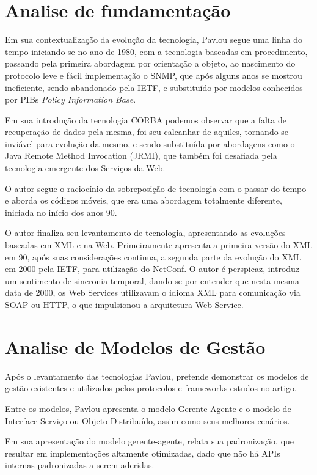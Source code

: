 \documentclass[12pt]{article}
\begin{document}
\section{Analise de fundamentação}

Em sua contextualização da evolução da tecnologia, Pavlou segue uma linha do tempo iniciando-se no ano de 1980, com a tecnologia baseadas em procedimento, passando pela primeira abordagem por orientação a objeto, ao nascimento do protocolo leve e fácil implementação o SNMP, que após alguns anos se mostrou ineficiente, sendo abandonado pela IETF, e substituído por modelos conhecidos por PIBs \textit{Policy Information Base}.

Em sua introdução da tecnologia CORBA podemos observar que a falta de recuperação de dados pela mesma, foi seu calcanhar de aquiles, tornando-se inviável para evolução da mesmo, e sendo substituída por abordagens como o Java Remote Method Invocation (JRMI), que também foi desafiada pela tecnologia emergente dos Serviços da Web.

O autor segue o raciocínio da sobreposição de tecnologia com o passar do tempo e aborda os códigos móveis, que era uma abordagem totalmente diferente, iniciada no início dos anos 90.

O autor finaliza seu levantamento de tecnologia, apresentando as evoluções baseadas em XML e na Web. Primeiramente apresenta a primeira versão do XML em 90, após suas considerações continua, a segunda parte da evolução do XML em 2000 pela IETF, para utilização do NetConf. O autor é perspicaz, introduz um sentimento de sincronia temporal, dando-se por entender que nesta mesma data de 2000, os Web Services utilizavam o idioma XML para comunicação via SOAP ou HTTP, o que impulsionou a arquitetura Web Service.      


\section{Analise de Modelos de Gestão}
	Após o levantamento das tecnologias Pavlou, pretende demonstrar os modelos de gestão existentes e utilizados pelos protocolos e frameworks estudos no artigo.
	
	Entre os modelos, Pavlou apresenta o modelo Gerente-Agente e o modelo de Interface Serviço ou Objeto Distribuído, assim como seus melhores cenários.
	
	Em sua apresentação do modelo gerente-agente, relata sua padronização, que resultar em implementações altamente otimizadas, dado que não há APIs internas padronizadas a serem aderidas.
	
\end{document}
